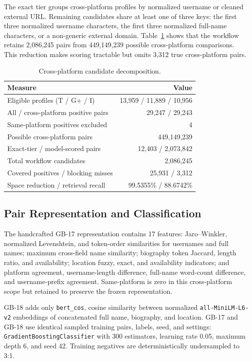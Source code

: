 \documentclass[conference]{IEEEtran}
\begin{document}
The exact tier groups cross-platform profiles by normalized username or cleaned external URL. Remaining candidates share at least one of three keys: the first three normalized username characters, the first three normalized full-name characters, or a non-generic external domain. Table~\ref{tab:retrieval} shows that the workflow retains 2,086,245 pairs from 449,149,239 possible cross-platform comparisons. This reduction makes scoring tractable but omits 3,312 true cross-platform pairs.

\begin{table}[t]
\caption{Cross-platform candidate decomposition.}
\label{tab:retrieval}
\centering
\begin{tabular}{@{}lr@{}}
\toprule
Measure & Value\\
\midrule
Eligible profiles (T / G+ / I) & 13,959 / 11,889 / 10,956\\
All / cross-platform positive pairs & 29,247 / 29,243\\
Same-platform positives excluded & 4\\
Possible cross-platform pairs & 449,149,239\\
Exact-tier / model-scored pairs & 12,403 / 2,073,842\\
Total workflow candidates & 2,086,245\\
Covered positives / blocking misses & 25,931 / 3,312\\
Space reduction / retrieval recall & 99.5355\% / 88.6742\%\\
\bottomrule
\end{tabular}
\end{table}

\subsection{Pair Representation and Classification}
The handcrafted GB-17 representation contains 17 features: Jaro--Winkler, normalized Levenshtein, and token-order similarities for usernames and full names; maximum cross-field name similarity; biography token Jaccard, length ratio, and availability; location fuzzy, exact, and availability indicators; and platform agreement, username-length difference, full-name word-count difference, and username-prefix agreement. Same-platform is zero in this cross-platform scope but retained to preserve the frozen representation.

GB-18 adds only \texttt{bert\_cos}, cosine similarity between normalized \texttt{all-MiniLM-L6-v2} embeddings of concatenated full name, biography, and location. GB-17 and GB-18 use identical sampled training pairs, labels, seed, and settings: \texttt{GradientBoostingClassifier} with 300 estimators, learning rate 0.05, maximum depth 6, and seed 42. Training negatives are deterministically undersampled to 3:1.
\end{document}
